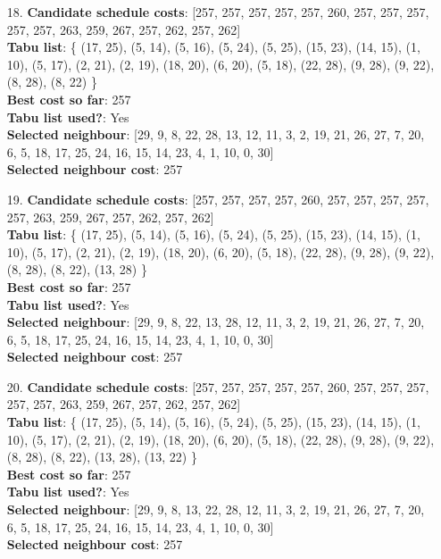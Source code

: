 \documentclass[fleqn]{article}
\begin{document}
\begin{itemize}
    \item[18.] \textbf{Candidate schedule costs}: [257, 257, 257, 257, 257, 260, 257, 257, 257, 257, 257, 263, 259, 267, 257, 262, 257, 262] \\
    \textbf{Tabu list}: \{ (17, 25), (5, 14), (5, 16), (5, 24), (5, 25), (15, 23), (14, 15), (1, 10), (5, 17), (2, 21), (2, 19), (18, 20), (6, 20), (5, 18), (22, 28), (9, 28), (9, 22), (8, 28), (8, 22) \} \\
    \textbf{Best cost so far}: 257 \\
    \textbf{Tabu list used?}: Yes \\
    \textbf{Selected neighbour}: [29, 9, 8, 22, 28, 13, 12, 11, 3, 2, 19, 21, 26, 27, 7, 20, 6, 5, 18, 17, 25, 24, 16, 15, 14, 23, 4, 1, 10, 0, 30] \\
    \textbf{Selected neighbour cost}: 257
      

    \item[19.] \textbf{Candidate schedule costs}: [257, 257, 257, 257, 260, 257, 257, 257, 257, 257, 263, 259, 267, 257, 262, 257, 262] \\
    \textbf{Tabu list}: \{ (17, 25), (5, 14), (5, 16), (5, 24), (5, 25), (15, 23), (14, 15), (1, 10), (5, 17), (2, 21), (2, 19), (18, 20), (6, 20), (5, 18), (22, 28), (9, 28), (9, 22), (8, 28), (8, 22), (13, 28) \} \\
    \textbf{Best cost so far}: 257 \\
    \textbf{Tabu list used?}: Yes \\
    \textbf{Selected neighbour}: [29, 9, 8, 22, 13, 28, 12, 11, 3, 2, 19, 21, 26, 27, 7, 20, 6, 5, 18, 17, 25, 24, 16, 15, 14, 23, 4, 1, 10, 0, 30] \\
    \textbf{Selected neighbour cost}: 257
      

    \item[20.] \textbf{Candidate schedule costs}: [257, 257, 257, 257, 257, 260, 257, 257, 257, 257, 257, 263, 259, 267, 257, 262, 257, 262] \\
    \textbf{Tabu list}: \{ (17, 25), (5, 14), (5, 16), (5, 24), (5, 25), (15, 23), (14, 15), (1, 10), (5, 17), (2, 21), (2, 19), (18, 20), (6, 20), (5, 18), (22, 28), (9, 28), (9, 22), (8, 28), (8, 22), (13, 28), (13, 22) \} \\
    \textbf{Best cost so far}: 257 \\
    \textbf{Tabu list used?}: Yes \\
    \textbf{Selected neighbour}: [29, 9, 8, 13, 22, 28, 12, 11, 3, 2, 19, 21, 26, 27, 7, 20, 6, 5, 18, 17, 25, 24, 16, 15, 14, 23, 4, 1, 10, 0, 30] \\
    \textbf{Selected neighbour cost}: 257
      


\end{itemize}
\end{document}
